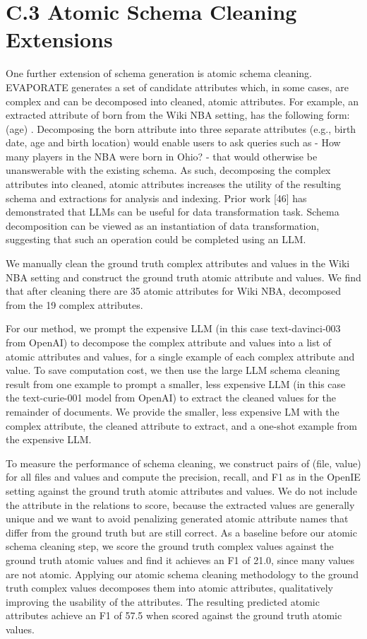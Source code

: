 \documentclass[10pt]{article}
\begin{document}
\section{C.3 Atomic Schema Cleaning Extensions}
One further extension of schema generation is atomic schema cleaning. EVAPORATE generates a set of candidate attributes which, in some cases, are complex and can be decomposed into cleaned, atomic attributes. For example, an extracted attribute of born from the Wiki NBA setting, has the following form:  (age) . Decomposing the born attribute into three separate attributes (e.g., birth date, age and birth location) would enable users to ask queries such as - How many players in the NBA were born in Ohio? - that would otherwise be unanswerable with the existing schema. As such, decomposing the complex attributes into cleaned, atomic attributes increases the utility of the resulting schema and extractions for analysis and indexing. Prior work [46] has demonstrated that LLMs can be useful for data transformation task. Schema decomposition can be viewed as an instantiation of data transformation, suggesting that such an operation could be completed using an LLM.

We manually clean the ground truth complex attributes and values in the Wiki NBA setting and construct the ground truth atomic attribute and values. We find that after cleaning there are 35 atomic attributes for Wiki NBA, decomposed from the 19 complex attributes.

For our method, we prompt the expensive LLM (in this case text-davinci-003 from OpenAI) to decompose the complex attribute and values into a list of atomic attributes and values, for a single example of each complex attribute and value. To save computation cost, we then use the large LLM schema cleaning result from one example to prompt a smaller, less expensive LLM (in this case the text-curie-001 model from OpenAI) to extract the cleaned values for the remainder of documents. We provide the smaller, less expensive LM with the complex attribute, the cleaned attribute to extract, and a one-shot example from the expensive LLM.

To measure the performance of schema cleaning, we construct pairs of (file, value) for all files and values and compute the precision, recall, and F1 as in the OpenIE setting against the ground truth atomic attributes and values. We do not include the attribute in the relations to score, because the extracted values are generally unique and we want to avoid penalizing generated atomic attribute names that differ from the ground truth but are still correct. As a baseline before our atomic schema cleaning step, we score the ground truth complex values against the ground truth atomic values and find it achieves an F1 of 21.0, since many values are not atomic. Applying our atomic schema cleaning methodology to the ground truth complex values decomposes them into atomic attributes, qualitatively improving the usability of the attributes. The resulting predicted atomic attributes achieve an F1 of 57.5 when scored against the ground truth atomic values.
\end{document}
